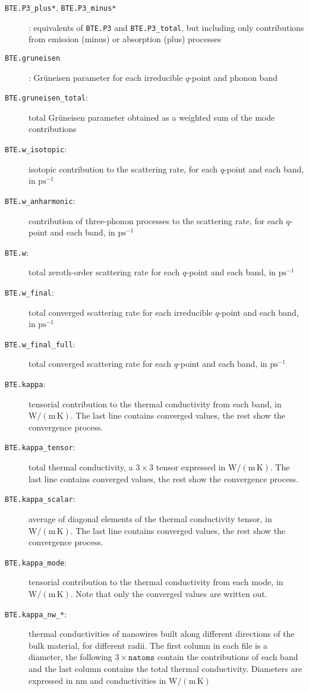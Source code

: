 \documentclass[a4paper,10pt,english]{article}
\begin{document}
\begin{description}
\item[\texttt{BTE.P3\_plus*}, \texttt{BTE.P3\_minus*}]: equivalents of \texttt{BTE.P3} and \texttt{BTE.P3\_total}, but including only contributions from emission (minus) or absorption (plus) processes
\item[\texttt{BTE.gruneisen}]: Gr\"uneisen parameter for each irreducible $q$-point and phonon band
\item[\texttt{BTE.gruneisen\_total}:] total Gr\"uneisen parameter obtained as a weighted sum of the mode contributions
\item[\texttt{BTE.w\_isotopic}:] isotopic contribution to the scattering rate, for each $q$-point and each band, in $\mathrm{ps^{-1}}$
\item[\texttt{BTE.w\_anharmonic}:] contribution of three-phonon processes to the scattering rate, for each $q$-point and each band, in $\mathrm{ps^{-1}}$
\item[\texttt{BTE.w}:] total zeroth-order scattering rate for each $q$-point and each band, in $\mathrm{ps^{-1}}$
\item[\texttt{BTE.w\_final}:] total converged scattering rate for each irreducible $q$-point and each band, in $\mathrm{ps^{-1}}$
\item[\texttt{BTE.w\_final\_full}: ] total converged scattering rate for each $q$-point and each band, in $\mathrm{ps^{-1}}$
\item[\texttt{BTE.kappa}:] tensorial contribution to the thermal conductivity from each band, in $\mathrm{W/\left(m\,K\right)}$. The last line contains converged values, the rest show the convergence process.
\item[\texttt{BTE.kappa\_tensor}:] total thermal conductivity, a $3\times 3$ tensor expressed in $\mathrm{W/\left(m\,K\right)}$. The last line contains converged values, the rest show the convergence process.
\item[\texttt{BTE.kappa\_scalar}:] average of diagonal elements of the thermal conductivity tensor, in $\mathrm{W/\left(m\,K\right)}$. The last line contains converged values, the rest show the convergence process.
\item[\texttt{BTE.kappa\_mode}:]  tensorial contribution to the thermal conductivity from each mode, in $\mathrm{W/\left(m\,K\right)}$. Note that only the converged values are written out.
\item[\texttt{BTE.kappa\_nw\_*}:] thermal conductivities of nanowires built along different directions of the bulk material, for different radii. The first column in each file is a diameter, the following $3\times\mathtt{natoms}$ contain the contributions of each band and the last column contains the total thermal conductivity. Diameters are expressed in $\mathrm{nm}$ and conductivities in $\mathrm{W/\left(m\,K\right)}$

\end{description}
\end{document}
